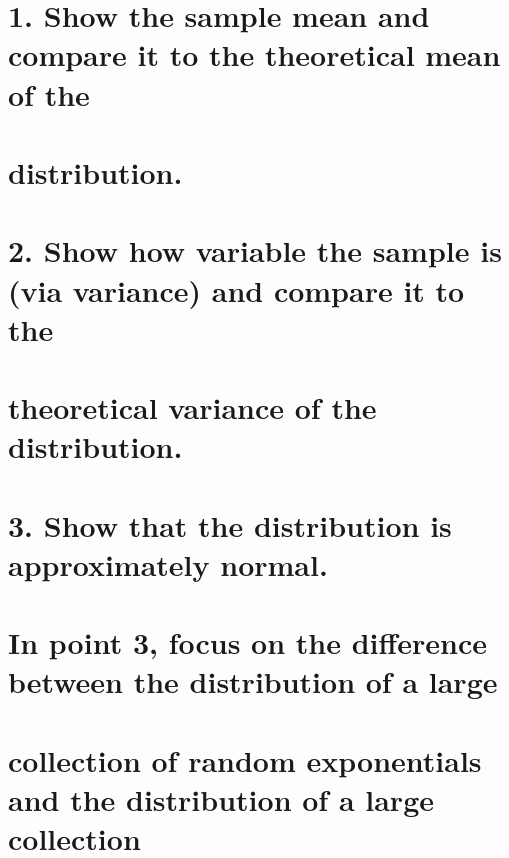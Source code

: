 \documentclass[
]{article}
\begin{document}
\hypertarget{show-the-sample-mean-and-compare-it-to-the-theoretical-mean-of-the}{%
\section{1. Show the sample mean and compare it to the theoretical mean
of
the}\label{show-the-sample-mean-and-compare-it-to-the-theoretical-mean-of-the}}

\hypertarget{distribution.}{%
\section{distribution.}\label{distribution.}}

\hypertarget{show-how-variable-the-sample-is-via-variance-and-compare-it-to-the}{%
\section{2. Show how variable the sample is (via variance) and compare
it to
the}\label{show-how-variable-the-sample-is-via-variance-and-compare-it-to-the}}

\hypertarget{theoretical-variance-of-the-distribution.}{%
\section{theoretical variance of the
distribution.}\label{theoretical-variance-of-the-distribution.}}

\hypertarget{show-that-the-distribution-is-approximately-normal.}{%
\section{3. Show that the distribution is approximately
normal.}\label{show-that-the-distribution-is-approximately-normal.}}

\hypertarget{in-point-3-focus-on-the-difference-between-the-distribution-of-a-large}{%
\section{In point 3, focus on the difference between the distribution of
a
large}\label{in-point-3-focus-on-the-difference-between-the-distribution-of-a-large}}

\hypertarget{collection-of-random-exponentials-and-the-distribution-of-a-large-collection}{%
\section{collection of random exponentials and the distribution of a
large
collection}\label{collection-of-random-exponentials-and-the-distribution-of-a-large-collection}}
\end{document}
